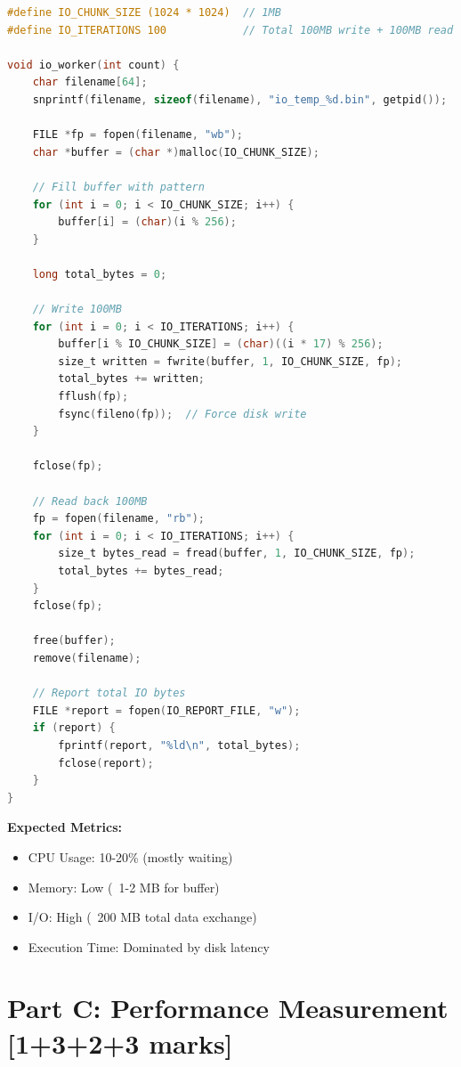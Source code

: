 \documentclass[12pt,a4paper]{article}
\begin{document}
\begin{lstlisting}[language=C, caption=I/O Worker Implementation]
#define IO_CHUNK_SIZE (1024 * 1024)  // 1MB
#define IO_ITERATIONS 100            // Total 100MB write + 100MB read

void io_worker(int count) {
    char filename[64];
    snprintf(filename, sizeof(filename), "io_temp_%d.bin", getpid());
    
    FILE *fp = fopen(filename, "wb");
    char *buffer = (char *)malloc(IO_CHUNK_SIZE);
    
    // Fill buffer with pattern
    for (int i = 0; i < IO_CHUNK_SIZE; i++) {
        buffer[i] = (char)(i % 256);
    }
    
    long total_bytes = 0;
    
    // Write 100MB
    for (int i = 0; i < IO_ITERATIONS; i++) {
        buffer[i % IO_CHUNK_SIZE] = (char)((i * 17) % 256);
        size_t written = fwrite(buffer, 1, IO_CHUNK_SIZE, fp);
        total_bytes += written;
        fflush(fp);
        fsync(fileno(fp));  // Force disk write
    }
    
    fclose(fp);
    
    // Read back 100MB
    fp = fopen(filename, "rb");
    for (int i = 0; i < IO_ITERATIONS; i++) {
        size_t bytes_read = fread(buffer, 1, IO_CHUNK_SIZE, fp);
        total_bytes += bytes_read;
    }
    fclose(fp);
    
    free(buffer);
    remove(filename);
    
    // Report total IO bytes
    FILE *report = fopen(IO_REPORT_FILE, "w");
    if (report) {
        fprintf(report, "%ld\n", total_bytes);
        fclose(report);
    }
}
\end{lstlisting}

\textbf{Expected Metrics:}
\begin{itemize}
    \item CPU Usage: 10-20\% (mostly waiting)
    \item Memory: Low (~1-2 MB for buffer)
    \item I/O: High (~200 MB total data exchange)
    \item Execution Time: Dominated by disk latency
\end{itemize}

\section{Part C: Performance Measurement [1+3+2+3 marks]}
\end{document}
